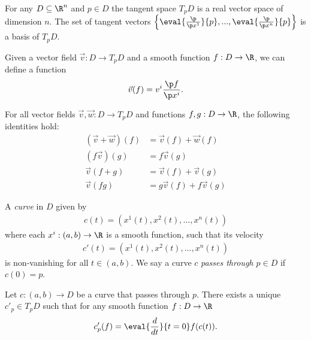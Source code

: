 \documentclass{article}
\begin{document}
\begin{theorem}[Notes 4.4]
    For any $D\subseteq \R^n$ and $p\in D$ the tangent space $T_pD$ is a real vector space
    of dimension $n$. The set of tangent vectors 
    $\left\lbrace\eval{\frac{\p }{\p x^1}}{p}, ...,\eval{\frac{\p }{\p x^n}}{p}\right\rbrace$
    is a basis of $T_pD$.
\end{theorem}

\begin{definition}
    Given a vector field $\vec v:D\to T_pD$ and a smooth function $f:D\to\R$,
    we can define a function 
    \begin{align*}
        \vec v(f) = v^i\frac{\p f}{\p x^i}.
    \end{align*}
\end{definition}

\begin{proposition}[Notes 4.7]
    For all vector fields $\vec v,\vec w:D\to T_pD$ and functions $f,g:D\to\R$, the following identities hold:
    \begin{align*}
        (\vec v+\vec w)(f) &= \vec v(f) + \vec w(f)\\
        (f\vec v)(g)  &= f\vec v(g) \\
        \vec v(f+g)   &= \vec v(f) + \vec v(g) \\
        \vec v(fg)    &= g\vec v(f) + f\vec v(g)
    \end{align*}
\end{proposition}

\begin{definition}
    A \emph{curve} in $D$ given by
    \begin{align*}
        c(t) = (x^1(t), x^2(t), ..., x^n(t))
    \end{align*}
    where each $x^i:(a,b)\to\R$ is a smooth function, such that its velocity
    \begin{align*}
        c'(t)=(x^1(t), x^2(t), ..., x^n(t))
    \end{align*}
    is non-vanishing for all $t\in(a,b)$. 
    We say a curve $c$ \emph{passes through $p\in D$} if $c(0)=p$.
\end{definition}

\begin{proposition}[Notes 4.9]
    Let $c:(a,b)\to D$ be a curve that passes through $p$. There exists a unique
    $c'_p\in T_p D$ such that for any smooth function $f:D\to\R$
    \begin{align*}
        c'_p(f) = \eval{\frac{d}{dt}}{t=0} f(c(t)).
    \end{align*}
\end{proposition}
\end{document}
